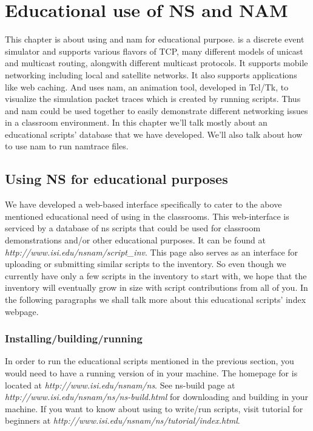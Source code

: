\chapter{Educational use of NS and NAM}
\label{chap:edu}

This chapter is about using \ns and nam for educational purpose. \ns is a discrete event simulator and supports various flavors of TCP, many different models of unicast and multicast routing, alongwith different multicast protocols. It supports mobile networking including local and satellite networks. It also supports applications like web caching. And \ns uses nam, an animation tool, developed in Tcl/Tk, to visualize the simulation packet traces which is created by running \ns scripts. Thus \ns and nam could be used together to easily demonstrate different networking issues in a classroom environment. In this chapter we'll talk mostly about an educational scripts' database that we have developed. We'll also talk about how to use nam to run namtrace files.


\section{Using NS for educational purposes}
\label{sec:ns-for-edu}
We have developed a web-based interface specifically to cater to the above mentioned educational need of using \ns in the classrooms. This web-interface is serviced by a database of ns scripts that could be used for classroom demonstrations and/or other educational purposes. It can be found at {\em http://www.isi.edu/nsnam/script\_inv}. This page also serves as an interface for uploading or submitting similar scripts to the inventory. So even though we currently have only a few scripts in the inventory to start with, we hope that the inventory will eventually grow in size with script contributions from all of you. In the following paragraphs we shall talk more about this educational scripts' index webpage.


\subsection{Installing/building/running \ns}
In order to run the educational scripts mentioned in the previous section, you would need to have a running version of \ns in your machine. The homepage for \ns is located at {\em http://www.isi.edu/nsnam/ns}. See ns-build page at {\em http://www.isi.edu/nsnam/ns/ns-build.html} for downloading and building \ns in your machine. If you want to know about using \ns to write/run scripts, visit \ns tutorial for beginners at {\em http://www.isi.edu/nsnam/ns/tutorial/index.html}. 


